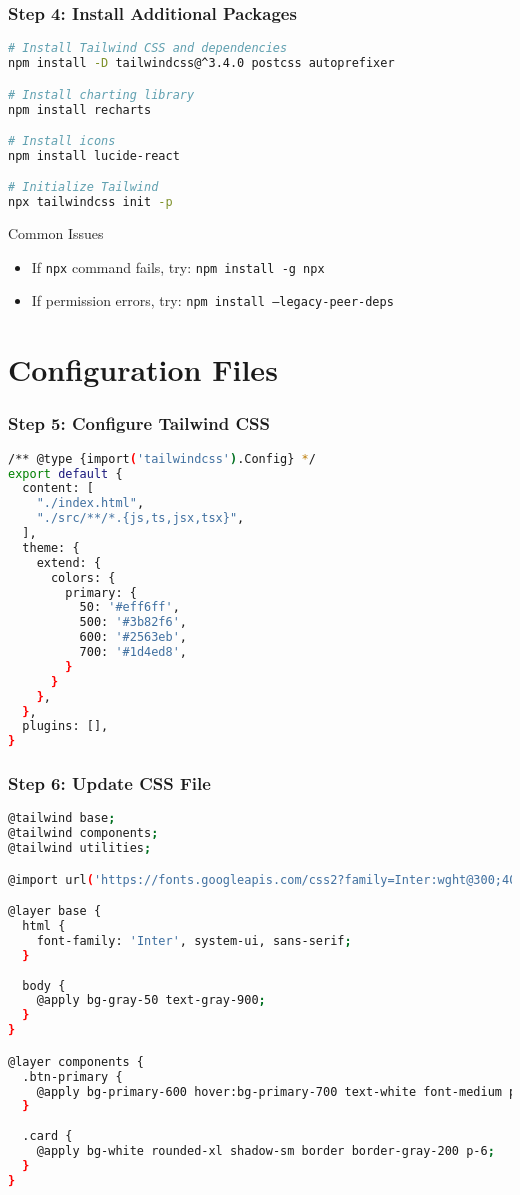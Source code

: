 \documentclass[aspectratio=169]{beamer}
\begin{document}
\begin{frame}[fragile]
\frametitle{Step 4: Install Additional Packages}
\begin{lstlisting}[language=bash, caption=Install Required Packages]
# Install Tailwind CSS and dependencies
npm install -D tailwindcss@^3.4.0 postcss autoprefixer

# Install charting library
npm install recharts

# Install icons
npm install lucide-react

# Initialize Tailwind
npx tailwindcss init -p
\end{lstlisting}

\begin{alertblock}{Common Issues}
\begin{itemize}
\item If \texttt{npx} command fails, try: \texttt{npm install -g npx}
\item If permission errors, try: \texttt{npm install --legacy-peer-deps}
\end{itemize}
\end{alertblock}
\end{frame}

\section{Configuration Files}

\begin{frame}[fragile]
\frametitle{Step 5: Configure Tailwind CSS}
\begin{lstlisting}[language=bash, caption=Update tailwind.config.js]
/** @type {import('tailwindcss').Config} */
export default {
  content: [
    "./index.html",
    "./src/**/*.{js,ts,jsx,tsx}",
  ],
  theme: {
    extend: {
      colors: {
        primary: {
          50: '#eff6ff',
          500: '#3b82f6',
          600: '#2563eb',
          700: '#1d4ed8',
        }
      }
    },
  },
  plugins: [],
}
\end{lstlisting}
\end{frame}

\begin{frame}[fragile]
\frametitle{Step 6: Update CSS File}
\begin{lstlisting}[language=bash, caption=Update src/index.css]
@tailwind base;
@tailwind components;
@tailwind utilities;

@import url('https://fonts.googleapis.com/css2?family=Inter:wght@300;400;500;600;700&display=swap');

@layer base {
  html {
    font-family: 'Inter', system-ui, sans-serif;
  }
  
  body {
    @apply bg-gray-50 text-gray-900;
  }
}

@layer components {
  .btn-primary {
    @apply bg-primary-600 hover:bg-primary-700 text-white font-medium py-2 px-4 rounded-lg transition-colors duration-200;
  }
  
  .card {
    @apply bg-white rounded-xl shadow-sm border border-gray-200 p-6;
  }
}
\end{lstlisting}
\end{frame}
\end{document}
